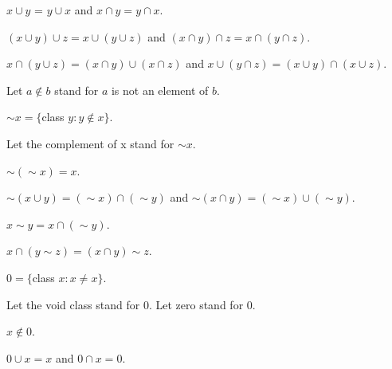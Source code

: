 \documentclass[a4paper,draft]{amsproc}
\begin{document}
\begin{forthel}
\begin{theorem}[6]
$x \cup y$ = $y \cup x$ and $x \cap y = y \cap x$.
\end{theorem}

\begin{theorem}[7]
$(x \cup y) \cup z = x \cup (y \cup z)$ 
and $(x \cap y) \cap z = x \cap (y \cap z)$.
\end{theorem}

\begin{theorem}[8]
$x \cap (y \cup z) = (x \cap y) \cup (x \cap z)$
and $x \cup (y \cap z) = (x \cup y) \cap (x \cup z)$.
\end{theorem}

Let $a \notin b$ stand for $a$ is not an element of $b$.

\begin{definition}[10] 
$\sim x = \{$class $y : y \notin x\}$.
\end{definition}
Let the complement of x stand for $\sim x$.

\begin{theorem}[11]
$\sim (\sim x) = x$.
\end{theorem}

\begin{theorem}[12]
$\sim (x \cup y) = (\sim x) \cap (\sim y)$ 
and $\sim (x \cap y) = (\sim x) \cup (\sim y)$.
\end{theorem}

\begin{definition}[13] $x \sim y = x \cap (\sim y)$.\end{definition}

\begin{theorem}[14]
$x \cap (y \sim z) = (x \cap y) \sim z$.
\end{theorem}

\begin{definition}[15] 
$0 = \{$class $x : x \neq x\}$.
\end{definition}
Let the void class stand for 0.
Let zero stand for 0.

\begin{theorem}[16]
$x \notin 0$.
\end{theorem}

\begin{theorem}[17]
$0 \cup x = x$ and $0 \cap x = 0$.
\end{theorem}


\end{forthel}
\end{document}
